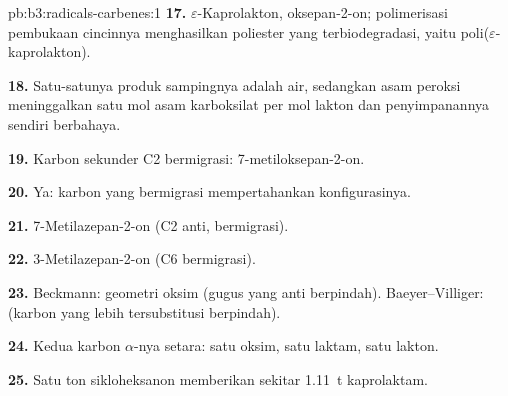 \begin{solution}{pb:b3:radicals-carbenes:1}
\textbf{17.} $\varepsilon$-Kaprolakton, oksepan-2-on; polimerisasi pembukaan cincinnya
menghasilkan poliester yang terbiodegradasi, yaitu poli($\varepsilon$-kaprolakton).

\textbf{18.} Satu-satunya produk sampingnya adalah air, sedangkan asam peroksi meninggalkan satu mol
asam karboksilat per mol lakton dan penyimpanannya sendiri berbahaya.

\textbf{19.} Karbon sekunder C2 bermigrasi: 7-metiloksepan-2-on.

\textbf{20.} Ya: karbon yang bermigrasi mempertahankan konfigurasinya.

\textbf{21.} 7-Metilazepan-2-on (C2 anti, bermigrasi).

\textbf{22.} 3-Metilazepan-2-on (C6 bermigrasi).

\textbf{23.} Beckmann: geometri oksim (gugus yang anti berpindah).
Baeyer--Villiger:  (karbon yang lebih tersubstitusi berpindah).

\textbf{24.} Kedua karbon $\alpha$-nya setara: satu oksim, satu laktam, satu lakton.

\textbf{25.} Satu ton sikloheksanon memberikan sekitar \qty{1.11}{t} kaprolaktam.
\end{solution}
